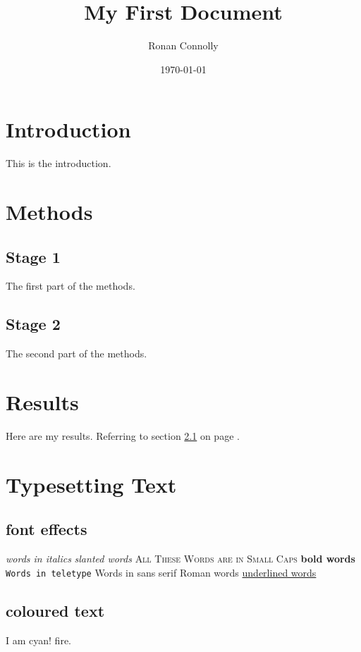 \documentclass[a4paper,12pt]{article}
\begin{document}
\title{My First Document}
\author{Ronan Connolly}
\date{\today}
\maketitle

\tableofcontents
\newpage
{}

\section{Introduction}
This is the introduction.

\section{Methods}

\subsection{Stage 1}
\label{sec1}
The first part of the methods.

\subsection{Stage 2}
The second part of the methods.

\section{Results}
Here are my results. Referring to section \ref{sec1} on page \pageref{sec1}.

\section{Typesetting Text}
\subsection{font effects}

\textit{words in italics}
\textsl{slanted words}
\textsc{All These Words are in Small Caps}
\textbf{bold words}
\texttt{Words in teletype}
\textsf{Words in sans serif}
\textrm{Roman words}
\underline{underlined words}

\subsection{coloured text}
{\color{cyan}I am cyan!}
{\color{red} fire.}
\end{document}
